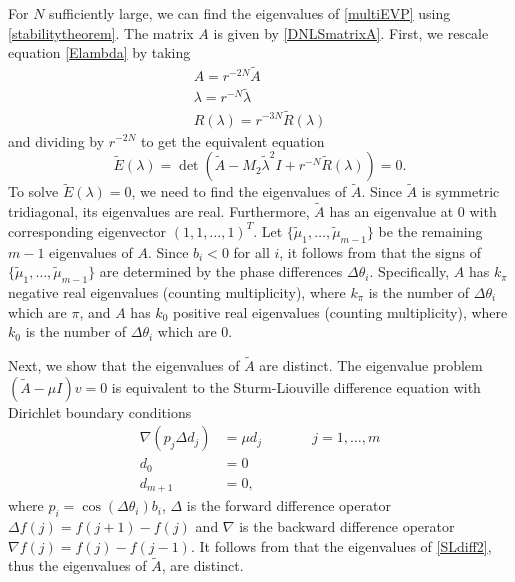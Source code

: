 \documentclass[12pt]{elsarticle}
\begin{document}
For $N$ sufficiently large, we can find the eigenvalues of \cref{multiEVP} using \cref{stabilitytheorem}. The matrix $A$ is given by \cref{DNLSmatrixA}. First, we rescale equation \cref{Elambda} by taking
\begin{align*}
A = r^{-2N} \tilde{A} \\
\lambda = r^{-N} \tilde{\lambda} \\
R(\lambda) = r^{-3N} \tilde{R}(\lambda)
\end{align*}
and dividing by $r^{-2N}$ to get the equivalent equation
\begin{equation}\label{DNLStildeE}
\tilde{E}(\lambda) = 
\det(\tilde{A} - M_2 \tilde{\lambda}^2 I + r^{-N} \tilde{R}(\lambda)) = 0.
\end{equation}
To solve $\tilde{E}(\lambda) = 0$, we need to find the eigenvalues of $\tilde{A}$. Since $\tilde{A}$ is symmetric tridiagonal, its eigenvalues are real. Furthermore, $\tilde{A}$ has an eigenvalue at 0 with corresponding eigenvector $(1, 1, \dots, 1)^T$. Let $\{ \tilde{\mu}_1, \dots, \tilde{\mu}_{m-1}\}$ be the remaining $m-1$ eigenvalues of $A$. Since $b_i < 0$ for all $i$, it follows from \cite[Lemma 5.4]{Sandstede1998} that the signs of $\{ \tilde{\mu}_1, \dots, \tilde{\mu}_{m-1}\}$ are determined by the phase differences $\Delta\theta_i$. Specifically, $A$ has $k_\pi$ negative real eigenvalues (counting multiplicity), where $k_\pi$ is the number of $\Delta\theta_i$ which are $\pi$, and $A$ has $k_0$ positive real eigenvalues (counting multiplicity), where $k_0$ is the number of $\Delta\theta_i$ which are $0$. 

Next, we show that the eigenvalues of $\tilde{A}$ are distinct. The eigenvalue problem $(\tilde{A} - \mu I)v = 0$ is equivalent to the Sturm-Liouville difference equation with Dirichlet boundary conditions
\begin{equation}\label{SLdiff2}
\begin{aligned}
\nabla( p_j \Delta d_j ) &= \mu d_j && \qquad j = 1, \dots, m \\
d_0 &= 0 \\
d_{m+1} &= 0,
\end{aligned}
\end{equation}
where $p_i = \cos(\Delta\theta_i) b_i$, $\Delta$ is the forward difference operator $\Delta f(j) = f(j+1) - f(j)$ and $\nabla$ is the backward difference operator $\nabla f(j) = f(j) - f(j-1)$. It follows from \cite[Corollary 2.2.7]{Jirari1995} that the eigenvalues of \cref{SLdiff2}, thus the eigenvalues of $\tilde{A}$, are distinct.
\end{document}
